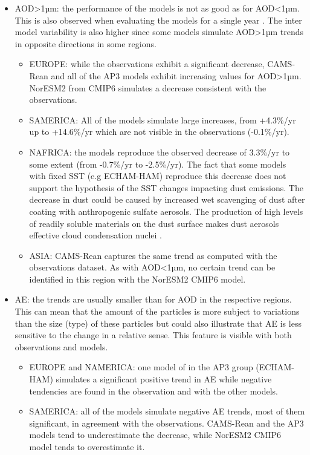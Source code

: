 \documentclass[acp, manuscript]{copernicus}
\begin{document}
\begin{itemize}
\begin{itemize}
       \end{itemize}
 \item AOD>1µm: the performance of the models is not as good as for AOD<1µm. This is also observed when evaluating the models for a single year \citep{jonaseval}. The inter model variability is also higher since some models simulate AOD>1µm trends in opposite directions in some regions.
       \begin{itemize}
        \item EUROPE: while the observations exhibit a significant decrease, CAMS-Rean and all of the AP3 models exhibit increasing values for AOD>1µm. NorESM2 from CMIP6 simulates a decrease consistent with the observations.
        \item SAMERICA: All of the models simulate large increases, from +4.3\%/yr up to +14.6\%/yr  which are not visible in the observations (-0.1\%/yr).
        \item NAFRICA: the models reproduce the observed decrease of 3.3\%/yr to some extent (from -0.7\%/yr to -2.5\%/yr). The fact that some models with fixed SST (e.g ECHAM-HAM) reproduce this decrease does not support the hypothesis of the SST changes impacting dust emissions. The decrease in dust could be caused by increased wet scavenging of dust after coating with anthropogenic sulfate aerosols. The production of high levels of readily soluble materials on the dust surface makes dust aerosols effective cloud condensation nuclei \citep{fan2004impact,bauer2005impact,bauer2007sulfate,neubauer2019global}.
        \item ASIA: CAMS-Rean captures the same trend as computed with the observations dataset. As with AOD<1µm, no certain trend can be identified  in this region with the NorESM2 CMIP6 model.
       \end{itemize}
 \item AE: the trends are usually smaller than for AOD in the respective regions. This can mean that the amount of the particles is more subject to variations than the size (type) of these particles but could also illustrate that AE is less sensitive to the change in a relative sense. This feature is visible with both observations and models.
       \begin{itemize}
        \item EUROPE and NAMERICA: one model of in the AP3 group (ECHAM-HAM) simulates a significant positive trend in AE while negative tendencies are found in the observation and with the other models.
        \item SAMERICA: all of the models simulate negative AE trends, most of them significant, in agreement with the observations. CAMS-Rean and the AP3 models tend to underestimate the decrease, while NorESM2 CMIP6 model tends to overestimate it.

\end{itemize}
\end{itemize}
\end{document}
